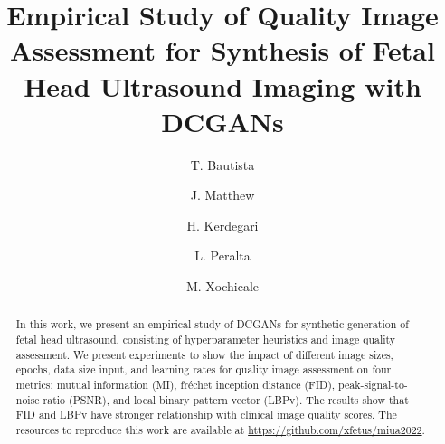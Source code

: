 \documentclass[runningheads]{llncs}
\begin{document}
\title{Empirical Study of Quality Image Assessment for Synthesis of Fetal Head Ultrasound Imaging with DCGANs}

\author{
T. Bautista \and %
J. Matthew \and %
H. Kerdegari \and %
L. Peralta \and %
M. Xochicale %
}

%
\maketitle              %

\begin{abstract}
In this work, we present an empirical study of DCGANs for synthetic generation of fetal head ultrasound, consisting of hyperparameter heuristics and image quality assessment.
We present experiments to show the impact of different image sizes, epochs, data size input, and learning rates for quality image assessment on four metrics: mutual information (MI), fr\'echet inception distance (FID), peak-signal-to-noise ratio (PSNR), and local binary pattern vector (LBPv). 
The results show that FID and LBPv have stronger relationship with clinical image quality scores.
The resources to reproduce this work are available at %
\url{https://github.com/xfetus/miua2022}.
\end{abstract}
\end{document}
